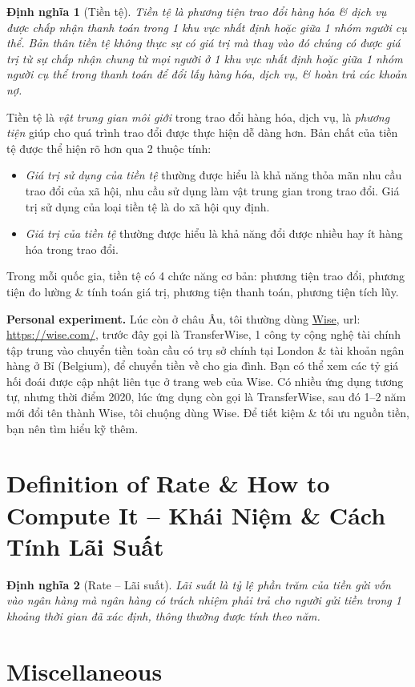 \documentclass{article}
\newtheorem{dinhnghia}{Định nghĩa}
\begin{document}
\begin{dinhnghia}[Tiền tệ]
	\emph{Tiền tệ} là phương tiện trao đổi hàng hóa \& dịch vụ được chấp nhận thanh toán trong 1 khu vực nhất định hoặc giữa 1 nhóm người cụ thể. Bản thân tiền tệ không thực sự có giá trị mà thay vào đó chúng có được giá trị từ sự chấp nhận chung từ mọi người ở 1 khu vực nhất định hoặc giữa 1 nhóm người cụ thể trong thanh toán để đổi lấy hàng hóa, dịch vụ, \& hoàn trả các khoản nợ.
\end{dinhnghia}
Tiền tệ là {\it vật trung gian môi giới} trong trao đổi hàng hóa, dịch vụ, là {\it phương tiện} giúp cho quá trình trao đổi được thực hiện dễ dàng hơn. Bản chất của tiền tệ được thể hiện rõ hơn qua 2 thuộc tính:
\begin{itemize}
	\item {\it Giá trị sử dụng của tiền tệ} thường được hiểu là khả năng thỏa mãn nhu cầu trao đổi của xã hội, nhu cầu sử dụng làm vật trung gian trong trao đổi. Giá trị sử dụng của loại tiền tệ là do xã hội quy định.
	\item {\it Giá trị của tiền tệ} thường được hiểu là khả năng đổi được nhiều hay ít hàng hóa trong trao đổi.
\end{itemize}
Trong mỗi quốc gia, tiền tệ có 4 chức năng cơ bản: phương tiện trao đổi, phương tiện đo lường \& tính toán giá trị, phương tiện thanh toán, phương tiện tích lũy.

{\bf Personal experiment.} Lúc còn ở châu Âu, tôi thường dùng \href{https://wise.com/}{Wise}, {\sc url}: \url{https://wise.com/}, trước đây gọi là TransferWise, 1 công ty cộng nghệ tài chính tập trung vào chuyển tiền toàn cầu có trụ sở chính tại London \& tài khoản ngân hàng ở Bỉ (Belgium), để chuyển tiền về cho gia đình. Bạn có thể xem các tỷ giá hối đoái được cập nhật liên tục ở trang web của Wise. Có nhiều ứng dụng tương tự, nhưng thời điểm 2020, lúc ứng dụng còn gọi là TransferWise, sau đó 1--2 năm mới đổi tên thành Wise, tôi chuộng dùng Wise. Để tiết kiệm \& tối ưu nguồn tiền, bạn nên tìm hiểu kỹ thêm.


\section{Definition of Rate \& How to Compute It -- Khái Niệm \& Cách Tính Lãi Suất}

\begin{dinhnghia}[Rate -- Lãi suất]
	\emph{Lãi suất} là tỷ lệ phần trăm của tiền gửi vốn vào ngân hàng mà ngân hàng có trách nhiệm phải trả cho người gửi tiền trong 1 khoảng thời gian đã xác định, thông thường được tính theo năm.
\end{dinhnghia}


\section{Miscellaneous}


\printbibliography[heading=bibintoc]
	
\end{document}
